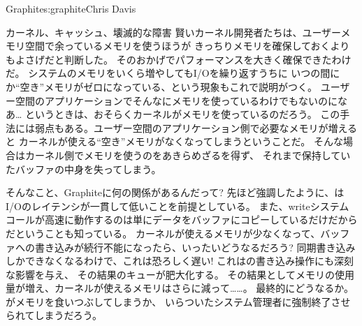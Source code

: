 \begin{aosachapter}{Graphite}{s:graphite}{Chris Davis}
\begin{aosasect1}{カーネル、キャッシュ、壊滅的な障害}
賢いカーネル開発者たちは、ユーザーメモリ空間で余っているメモリを使うほうが
きっちりメモリを確保しておくよりもよさげだと判断した。
そのおかげでパフォーマンスを大きく確保できたわけだ。
システムのメモリをいくら増やしてもI/Oを繰り返すうちに
いつの間にか``空き''メモリがゼロになっている、という現象もこれで説明がつく。
ユーザー空間のアプリケーションでそんなにメモリを使っているわけでもないのになあ…
というときは、おそらくカーネルがメモリを使っているのだろう。
この手法には弱点もある。ユーザー空間のアプリケーション側で必要なメモリが増えると
カーネルが使える``空き''メモリがなくなってしまうということだ。
そんな場合はカーネル側でメモリを使うのをあきらめざるを得ず、
それまで保持していたバッファの中身を失ってしまう。

そんなこと、Graphiteに何の関係があるんだって?
先ほど強調したように、はI/Oのレイテンシが一貫して低いことを前提としている。
また、writeシステムコールが高速に動作するのは単にデータをバッファにコピーしているだけだからだということも知っている。
カーネルが使えるメモリが少なくなって、バッファへの書き込みが続行不能になったら、いったいどうなるだろう?
同期書き込みしかできなくなるわけで、これは恐ろしく遅い!
これはの書き込み操作にも深刻な影響を与え、
その結果のキューが肥大化する。
その結果としてメモリの使用量が増え、カーネルが使えるメモリはさらに減って……。
最終的にどうなるか。がメモリを食いつぶしてしまうか、
いらついたシステム管理者に強制終了させられてしまうだろう。


\end{aosasect1}
\end{aosachapter}
